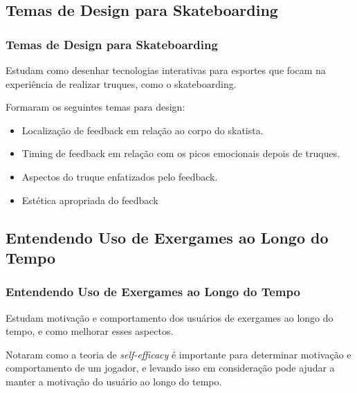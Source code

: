 \documentclass[brazil]{beamer}
\begin{document}
\subsection{Temas de Design para Skateboarding}
\begin{frame}
  \frametitle{Temas de Design para Skateboarding}
  \vspace{-10pt}
  Estudam como desenhar tecnologias interativas para esportes que focam na experiência de 
  realizar truques, como o skateboarding.
  
  \vspace{10pt}
  \pause
  Formaram os seguintes temas para design:
  \begin{itemize}
    \item Localização de feedback em relação ao corpo do skatista.
    \vspace{10pt}
    \item Timing de feedback em relação com os picos emocionais depois de truques.
    \vspace{10pt}
    \item Aspectos do truque enfatizados pelo feedback.
    \vspace{10pt}
    \item Estética apropriada do feedback
  \end{itemize}
\end{frame}

\subsection{Entendendo Uso de Exergames ao Longo do Tempo}
\begin{frame}
  \frametitle{Entendendo Uso de Exergames ao Longo do Tempo}
  \vspace{-10pt}
  Estudam motivação e comportamento dos usuários de exergames ao longo do tempo,
  e como melhorar esses aspectos.
  
  \vspace{10pt}
  \pause
  Notaram como a teoria de \textit{self-efficacy} é importante para determinar
  motivação e comportamento de um jogador, e levando isso em consideração pode
  ajudar a manter a motivação do usuário ao longo do tempo.
\end{frame}

\end{document}
